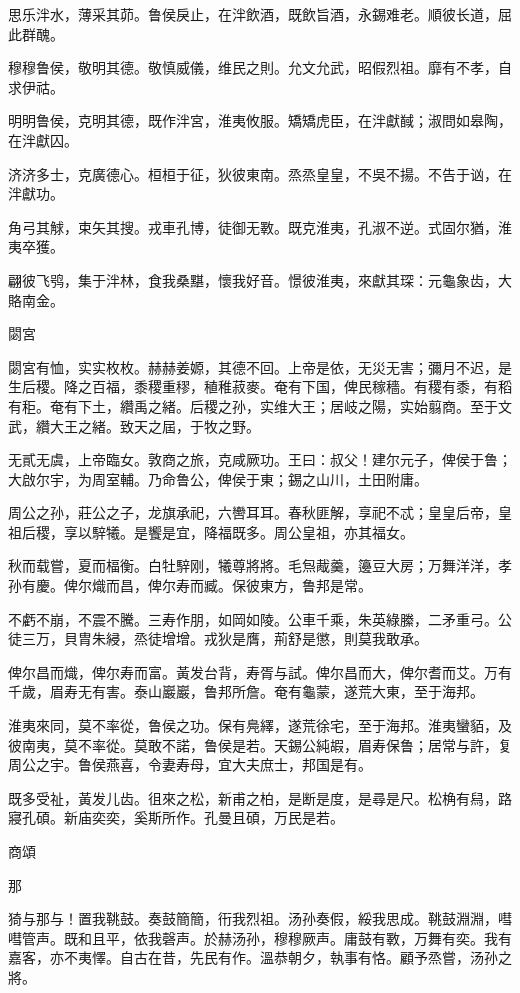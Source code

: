 思乐泮水，薄采其茆。鲁侯戾止，在泮飲酒，既飲旨酒，永錫难老。順彼长道，屈此群醜。

穆穆鲁侯，敬明其德。敬慎威儀，维民之則。允文允武，昭假烈祖。靡有不孝，自求伊祜。

明明鲁侯，克明其德，既作泮宮，淮夷攸服。矯矯虎臣，在泮獻馘；淑問如皋陶，在泮獻囚。

济济多士，克廣德心。桓桓于征，狄彼東南。烝烝皇皇，不吳不揚。不告于讻，在泮獻功。

角弓其觩，束矢其搜。戎車孔博，徒御无斁。既克淮夷，孔淑不逆。式固尔猶，淮夷卒獲。

翩彼飞鸮，集于泮林，食我桑黮，懷我好音。憬彼淮夷，來獻其琛：元龜象齿，大賂南金。

閟宮

閟宮有恤，实实枚枚。赫赫姜嫄，其德不回。上帝是依，无災无害；彌月不迟，是生后稷。降之百福，黍稷重穋，稙稚菽麥。奄有下国，俾民稼穡。有稷有黍，有稻有秬。奄有下土，纘禹之緒。后稷之孙，实维大王；居岐之陽，实始翦商。至于文武，纘大王之緒。致天之屆，于牧之野。

无貳无虞，上帝臨女。敦商之旅，克咸厥功。王曰：叔父！建尔元子，俾侯于鲁；大啟尔宇，为周室輔。乃命鲁公，俾侯于東；錫之山川，土田附庸。

周公之孙，莊公之子，龙旗承祀，六轡耳耳。春秋匪解，享祀不忒；皇皇后帝，皇祖后稷，享以騂犧。是饗是宜，降福既多。周公皇祖，亦其福女。

秋而载嘗，夏而楅衡。白牡騂刚，犧尊將將。毛炰胾羹，籩豆大房；万舞洋洋，孝孙有慶。俾尔熾而昌，俾尔寿而臧。保彼東方，鲁邦是常。

不虧不崩，不震不騰。三寿作朋，如岡如陵。公車千乘，朱英綠縢，二矛重弓。公徒三万，貝胄朱綅，烝徒增增。戎狄是膺，荊舒是懲，則莫我敢承。

俾尔昌而熾，俾尔寿而富。黃发台背，寿胥与試。俾尔昌而大，俾尔耆而艾。万有千歲，眉寿无有害。泰山巖巖，鲁邦所詹。奄有龜蒙，遂荒大東，至于海邦。

淮夷來同，莫不率從，鲁侯之功。保有鳧繹，遂荒徐宅，至于海邦。淮夷蠻貊，及彼南夷，莫不率從。莫敢不諾，鲁侯是若。天錫公純嘏，眉寿保鲁；居常与許，复周公之宇。鲁侯燕喜，令妻寿母，宜大夫庶士，邦国是有。

既多受祉，黃发儿齿。徂來之松，新甫之柏，是断是度，是尋是尺。松桷有舄，路寢孔碩。新庙奕奕，奚斯所作。孔曼且碩，万民是若。




商頌


那

猗与那与！置我鞉鼓。奏鼓簡簡，衎我烈祖。汤孙奏假，綏我思成。鞉鼓淵淵，嘒嘒管声。既和且平，依我磬声。於赫汤孙，穆穆厥声。庸鼓有斁，万舞有奕。我有嘉客，亦不夷懌。自古在昔，先民有作。溫恭朝夕，執事有恪。顧予烝嘗，汤孙之將。

